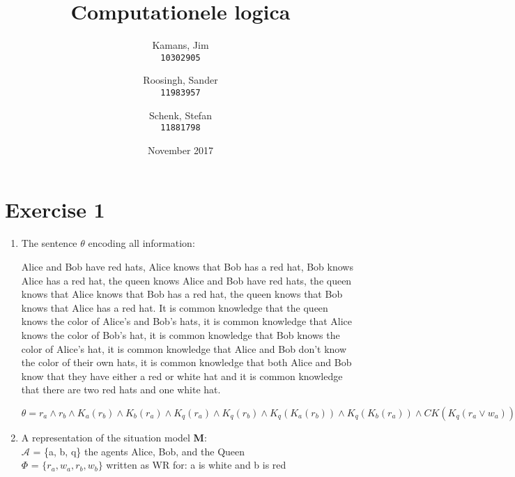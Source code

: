 \documentclass[leqno]{article}
\title{Computationele logica}
\author{
    Kamans, Jim\\
    \texttt{10302905}
    \and
    Roosingh, Sander\\
    \texttt{11983957}
    \and
    Schenk, Stefan\\
    \texttt{11881798}
}
\date{November 2017}
\begin{document}
\maketitle


\section*{Exercise 1}

\begin{enumerate}
	\item The sentence $\theta$ encoding all information:
	   
    Alice and Bob have red hats, Alice knows that Bob has a red hat, Bob knows Alice has a red hat, the queen knows Alice and Bob have red hats, the queen knows that Alice knows that Bob has a red hat, the queen knows that Bob knows that Alice has a red hat. It is common knowledge that the queen knows the color of Alice's and Bob's hats, it is common knowledge that Alice knows the color of Bob's hat, it is common knowledge that Bob knows the color of Alice's hat, it is common knowledge that Alice and Bob don't know the color of their own hats, it is common knowledge that both Alice and Bob know that they have either a red or white hat and it is common knowledge that there are two red hats and one white hat.
    
    $\theta = r_a \land r_b \land K_a(r_b) \land K_b(r_a) \land K_q(r_a) \land K_q(r_b) \land K_q(K_a(r_b)) \land K_q(K_b(r_a)) \land CK(K_q(r_a \lor w_a)) \land CK(K_q(r_b \lor w_b)) \land CK(K_a(r_b \lor w_b)) \land CK(K_b(r_a \lor w_a)) \land CK(\neg K_a(r_a)) \land CK(\neg K_a(\neg r_a)) \land CK(\neg K_a(w_a)) \land CK(\neg K_a(\neg w_a)) \land CK(\neg K_b(r_b)) \land CK(\neg K_b(\neg r_b)) \land CK(\neg K_b(w_b)) \land CK(\neg K_b(\neg w_b)) \land CK((r_a \land r_b) \lor (r_a \land w_b) \lor (w_a \land r_b))$

    \item A representation of the situation model \textbf{M}: \\

    $\mathcal{A}$ = \{a, b, q\} the agents Alice, Bob, and the Queen \\
    $\Phi$ = $\{r_a, w_a, r_b, w_b\}$ written as WR for:
    a is white and b is red \\


\end{enumerate}
\end{document}
